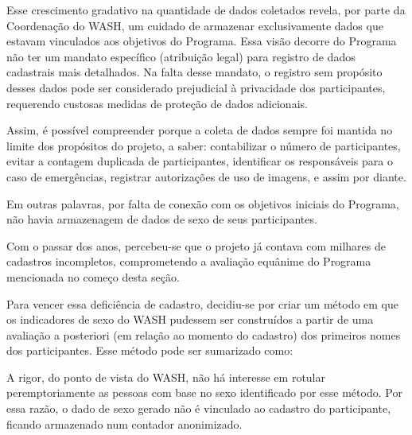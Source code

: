 Esse crescimento gradativo na quantidade de dados coletados revela, por parte da Coordenação do WASH, um cuidado de armazenar exclusivamente dados que estavam vinculados aos objetivos do Programa. Essa visão decorre do Programa não ter um mandato específico (atribuição legal) para registro de dados cadastrais mais detalhados. Na falta desse mandato, o registro sem propósito desses dados pode ser considerado prejudicial à privacidade dos participantes, requerendo custosas medidas de proteção de dados adicionais.

Assim, é possível compreender porque a coleta de dados sempre foi mantida no limite dos propósitos do projeto, a saber: contabilizar o número de participantes, evitar a contagem duplicada de participantes, identificar os responsáveis para o caso de emergências, registrar autorizações de uso de imagens, e assim por diante.

Em outras palavras, por falta de conexão com os objetivos iniciais do Programa, não havia armazenagem de dados de sexo de seus participantes.

Com o passar dos anos, percebeu-se que o projeto já contava com milhares de cadastros incompletos, comprometendo a avaliação equânime do Programa mencionada no começo desta seção.

Para vencer essa deficiência de cadastro, decidiu-se por criar um método em que os indicadores de sexo do WASH pudessem ser construídos a partir de uma avaliação a posteriori (em relação ao momento do cadastro) dos primeiros nomes dos participantes. Esse método pode ser sumarizado como:


\noindent\begin{center}\mbox{\centering{}}\end{center}


A rigor, do ponto de vista do WASH, não há interesse em rotular peremptoriamente as pessoas com base no sexo identificado por esse método. Por essa razão, o dado de sexo gerado não é vinculado ao cadastro do participante, ficando armazenado num contador anonimizado.

